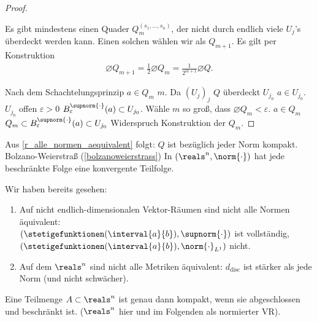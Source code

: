 \begin{proof}
\begin{figure}[H]
        \label{fig:teilquader}
    \end{figure}
    Es gibt mindestens einen Quader \( Q_m^{(s_1,\dotsc,s_n)} \), der nicht durch endlich viele \( U_j \)'s überdeckt werden kann. Einen solchen wählen wir als \( Q_{m+1} \). Es gilt per Konstruktion
    \begin{align*}
        \diameter{Q_{m+1}}=\frac{1}{2}\diameter{Q_m}=\frac{1}{2^{m+1}}\diameter{Q}.
    \end{align*}
    
    Nach dem Schachtelungsprinzip \texists \( a\in Q_m \) \tforall \( m \). Da \( (U_j)_j \) \( Q \) überdeckt \texists \( U_{j_0} \) \sd \( a\in U_{j_0} \). \( U_{j_0} \) offen \timplies \texists \( \varepsilon>0 \) \sd \( B_{\varepsilon}^{\supnorm{\cdot}}(a)\subset U_{j_0} \). Wähle \( m \) so groß, dass \( \diameter{Q_m}<\varepsilon \). \( a\in Q_m \) \timplies \( Q_m\subset B_{\varepsilon}^{\supnorm{\cdot}}(a)\subset U_{j_0} \) \contra Widerspruch Konstruktion der \( Q_m \).
\end{proof}
\begin{bemerkung}
    Aus \ref{r_alle_normen_aequivalent} folgt: \( Q \) ist bezüglich jeder Norm kompakt. Bolzano-Weierstraß (\ref{bolzanoweierstrass}) \timplies In \( (\reals^n,\norm{\cdot}) \) hat jede beschränkte Folge eine konvergente Teilfolge.
\end{bemerkung}
\begin{bemerkungen}
    Wir haben bereits gesehen:
    \begin{enumerate}
        \item Auf nicht endlich-dimensionalen Vektor-Räumen sind nicht alle Normen äquivalent:\\
        \( (\stetigefunktionen(\interval{a}{b}), \supnorm{\cdot}) \) ist vollständig, \( (\stetigefunktionen(\interval{a}{b}), \norm{\cdot}_{L^1}) \) nicht.
        \item Auf dem \( \reals^n \) sind nicht alle Metriken äquivalent: \( d_{\text{disc}} \) ist stärker als jede Norm (und nicht schwächer).
    \end{enumerate}
\end{bemerkungen}
\begin{satz}\label{heineborel}
    Eine Teilmenge \( A\subset \reals^n \) ist genau dann kompakt, wenn sie abgeschlossen und beschränkt ist. (\( \reals^n \) hier und im Folgenden als normierter VR). 
\end{satz}
